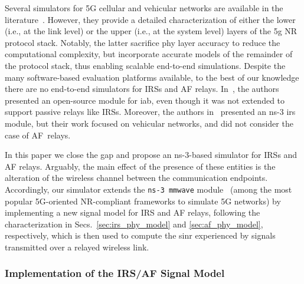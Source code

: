 Several simulators for 5G cellular and vehicular networks are available in the literature~\cite{mezzavilla2018end,choi20195g, nardini2020simu5g, patriciello2019e2e, pratschner2018versatile, muller2018flexible, jao2018wise,drago2020millicar}. However, they provide a detailed characterization of either the lower (i.e., at the link level) or the upper (i.e., at the system level) layers of the \gls{5g} NR protocol stack. 
Notably, the latter sacrifice \gls{phy} layer accuracy to reduce the computational complexity, but incorporate accurate models of the remainder of the protocol stack, thus enabling scalable end-to-end simulations.
Despite the many software-based evaluation platforms available, to the best of our knowledge there are no end-to-end simulators for IRSs and AF relays. In~\cite{polese2018end}, the authors presented an open-source module for \gls{iab}, even though it was not extended to support passive relays like IRSs. 
Moreover, the authors in~\cite{heimann2021modeling} presented an ns-3 \gls{irs} module, but their work focused on vehicular networks, and did not consider the case of AF~relays. 

In this paper we close the gap and propose an ns-3-based simulator for IRSs and AF relays.
Arguably, the main effect of the presence of these entities is the alteration of the wireless channel between the communication endpoints. 
Accordingly, our simulator extends the \texttt{ns-3 mmwave} module~\cite{mezzavilla2018end} (among the most popular 5G-oriented NR-compliant frameworks to simulate 5G networks) by implementing a new signal model for IRS and AF relays, following the characterization in Secs.~\ref{sec:irs_phy_model} and \ref{sec:af_phy_model}, respectively, which is then used to compute the \gls{sinr} experienced by signals transmitted over a relayed wireless link. 

 


\subsubsection{Implementation of the IRS/AF Signal Model} 
\label{sec:ext_ch_model}
 
